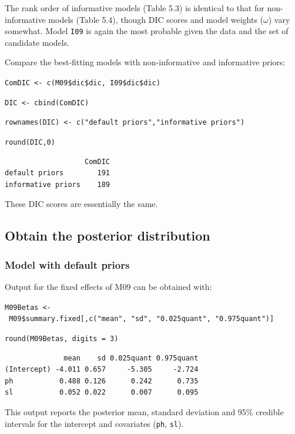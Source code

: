 \documentclass[
]{book}
\begin{document}
The rank order of informative models (Table 5.3) is identical to that for non-informative models (Table 5.4), though DIC scores and model weights (\(\omega\)) vary somewhat. Model \texttt{I09} is again the most probable given the data and the set of candidate models.

Compare the best-fitting models with non-informative and informative priors:

\texttt{ComDIC\ \textless{}-\ c(M09\$dic\$dic,\ I09\$dic\$dic)}

\texttt{DIC\ \textless{}-\ cbind(ComDIC)}

\texttt{rownames(DIC)\ \textless{}-\ c("default\ priors","informative\ priors")}

\texttt{round(DIC,0)}

\begin{verbatim}
                   ComDIC
default priors        191
informative priors    189
\end{verbatim}

These DIC scores are essentially the same.

\hypertarget{obtain-the-posterior-distribution-1}{%
\subsection{Obtain the posterior distribution}\label{obtain-the-posterior-distribution-1}}

\hypertarget{pois-def-priors}{%
\subsubsection{Model with default priors}\label{pois-def-priors}}

Output for the fixed effects of M09 can be obtained with:

\texttt{M09Betas\ \textless{}-\ M09\$summary.fixed{[},c("mean",\ "sd",\ "0.025quant",\ "0.975quant"){]}}

\texttt{round(M09Betas,\ digits\ =\ 3)}

\begin{verbatim}
              mean    sd 0.025quant 0.975quant
(Intercept) -4.011 0.657     -5.305     -2.724
ph           0.488 0.126      0.242      0.735
sl           0.052 0.022      0.007      0.095
\end{verbatim}

This output reports the posterior mean, standard deviation and 95\% credible intervals for the intercept and covariates (\texttt{ph}, \texttt{sl}).
\end{document}
